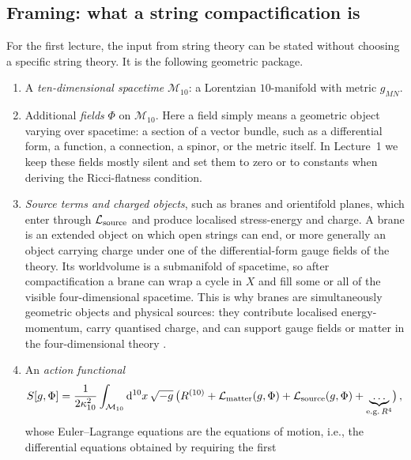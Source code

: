 \subsection{Framing: what a string compactification is}\label{ssec:L1-framing}

For the first lecture, the input from string theory can be stated
without choosing a specific string theory. It is the following
geometric package.

\begin{enumerate}[leftmargin=*]
    \item A \emph{ten-dimensional spacetime} $\mathcal{M}_{10}$:
    a Lorentzian $10$-manifold with metric $g_{MN}$.
    \item Additional \emph{fields} $\Phi$ on $\mathcal{M}_{10}$.
    Here a field simply means a geometric object varying over
    spacetime: a section of a vector bundle, such as a differential
    form, a function, a connection, a spinor, or the metric itself.
    In Lecture~1 we keep these fields mostly silent and set them to zero or
    to constants when deriving the Ricci-flatness condition.
    \item \emph{Source terms and charged objects}, such as branes
    and orientifold planes,
    which enter through $\mathcal{L}_{\rm source}$ and produce
    localised stress-energy and charge.
    A brane is an extended object on which open strings can
    end, or more generally an object carrying charge under one of the
    differential-form gauge fields of the theory.  Its worldvolume is
    a submanifold of spacetime, so after compactification a brane can
    wrap a cycle in $X$ and fill some or all of the visible
    four-dimensional spacetime.  This is why branes are simultaneously
    geometric objects and physical sources: they contribute localised
    energy-momentum, carry quantised charge, and can support gauge
    fields or matter in the four-dimensional theory
    \cite{Polchinski:1996na}.
    \item An \emph{action functional}
    \begin{equation}
        S[g,\Phi]
        =
        \frac{1}{2\kappa_{10}^2}\int_{\mathcal{M}_{10}}
        \mathrm{d}^{10}x\,\sqrt{-g}\,
        \bigl(R^{(10)}+\mathcal{L}_{\rm matter}(g,\Phi)
        +\mathcal{L}_{\rm source}(g,\Phi)+\underbrace{\ldots}_{\mathrm{e.g.}\, R^4}\bigr)\, ,
    \end{equation}
    whose Euler--Lagrange equations are the equations of motion,
    i.e., the differential equations obtained by requiring the first

\end{enumerate}
